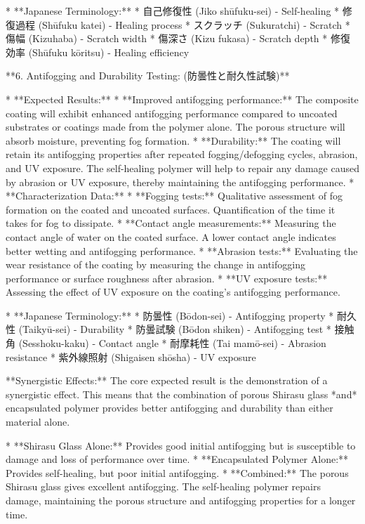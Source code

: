 \documentclass{article}
\begin{document}
*   **Japanese Terminology:**
    *   自己修復性 (Jiko shūfuku-sei) - Self-healing
    *   修復過程 (Shūfuku katei) - Healing process
    *   スクラッチ (Sukuratchi) - Scratch
    *   傷幅 (Kizuhaba) - Scratch width
    *   傷深さ (Kizu fukasa) - Scratch depth
    *   修復効率 (Shūfuku kōritsu) - Healing efficiency

**6. Antifogging and Durability Testing: (防曇性と耐久性試験)**

*   **Expected Results:**
    *   **Improved antifogging performance:** The composite coating will exhibit enhanced antifogging performance compared to uncoated substrates or coatings made from the polymer alone. The porous structure will absorb moisture, preventing fog formation.
    *   **Durability:** The coating will retain its antifogging properties after repeated fogging/defogging cycles, abrasion, and UV exposure.  The self-healing polymer will help to repair any damage caused by abrasion or UV exposure, thereby maintaining the antifogging performance.
    *   **Characterization Data:**
        *   **Fogging tests:** Qualitative assessment of fog formation on the coated and uncoated surfaces.  Quantification of the time it takes for fog to dissipate.
        *   **Contact angle measurements:** Measuring the contact angle of water on the coated surface.  A lower contact angle indicates better wetting and antifogging performance.
        *   **Abrasion tests:** Evaluating the wear resistance of the coating by measuring the change in antifogging performance or surface roughness after abrasion.
        *   **UV exposure tests:** Assessing the effect of UV exposure on the coating's antifogging performance.

*   **Japanese Terminology:**
    *   防曇性 (Bōdon-sei) - Antifogging property
    *   耐久性 (Taikyū-sei) - Durability
    *   防曇試験 (Bōdon shiken) - Antifogging test
    *   接触角 (Sesshoku-kaku) - Contact angle
    *   耐摩耗性 (Tai mamō-sei) - Abrasion resistance
    *   紫外線照射 (Shigaisen shōsha) - UV exposure

**Synergistic Effects:** The core expected result is the demonstration of a synergistic effect.  This means that the combination of porous Shirasu glass *and* encapsulated polymer provides better antifogging and durability than either material alone.

*   **Shirasu Glass Alone:** Provides good initial antifogging but is susceptible to damage and loss of performance over time.
*   **Encapsulated Polymer Alone:** Provides self-healing, but poor initial antifogging.
*   **Combined:**  The porous Shirasu glass gives excellent antifogging.  The self-healing polymer repairs damage, maintaining the porous structure and antifogging properties for a longer time.
\end{document}
